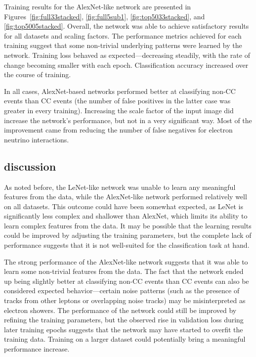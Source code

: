 \documentclass{pracalicmgr}
\begin{document}
\newpage

Training results for the AlexNet-like network are presented in Figures~\ref{fig:full33stacked}, \ref{fig:full5sub1}, \ref{fig:top5033stacked}, and \ref{fig:top5005stacked}. Overall, the network was able to achieve satisfactory results for all datasets and scaling factors. The performance metrics achieved for each training suggest that some non-trivial underlying patterns were learned by the network. Training loss behaved as expected—decreasing steadily, with the rate of change becoming smaller with each epoch. Classification accuracy increased over the course of training.

In all cases, AlexNet-based networks performed better at classifying non-CC events than CC events (the number of false positives in the latter case was greater in every training). Increasing the scale factor of the input image did increase the network's performance, but not in a very significant way. Most of the improvement came from reducing the number of false negatives for electron neutrino interactions.


\subsection{discussion}

As noted before, the LeNet-like network was unable to learn any meaningful features from the data, while the AlexNet-like network performed relatively well on all datasets. This outcome could have been somewhat expected, as LeNet is significantly less complex and shallower than AlexNet, which limits its ability to learn complex features from the data. It may be possible that the learning results could be improved by adjusting the training parameters, but the complete lack of performance suggests that it is not well-suited for the classification task at hand.

The strong performance of the AlexNet-like network suggests that it was able to learn some non-trivial features from the data.  The fact that the network ended up being slightly better at classifying non-CC events than CC events can also be considered expected behavior—certain noise patterns (such as the presence of tracks from other leptons or overlapping noise tracks) may be misinterpreted as electron showers. The performance of the network could still be improved by refining the training parameters, but the observed rise in validation loss during later training epochs suggests that the network may have started to overfit the training data. Training on a larger dataset could potentially bring a meaningful performance increase.
\end{document}
